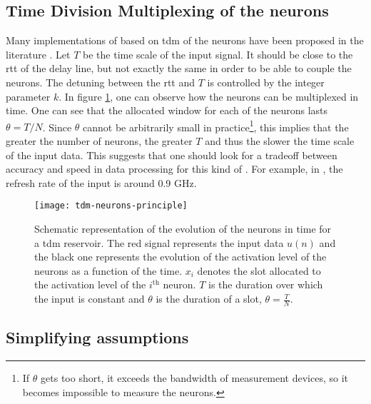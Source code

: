 
\subsection{Time Division Multiplexing of the neurons}

\label{tdm-neurons}

 Many implementations of \rcer based on \gls{tdm} of the neurons have been proposed in the literature \cite{Paquot2012, Antonik2017, Duport2016, Dejonckheere2014, Vandoorne2008, Vinckier2015}. Let $T$ be the time scale of the input signal. It should be close to the \gls{rtt} of the delay line, but not  exactly the same in order to be able to couple the neurons. The detuning between the \gls{rtt} and $T$ is controlled by the integer parameter $k$. In figure \ref{tdm-neurons-principle}, one can observe how the neurons can be multiplexed in time. One can see that the allocated window for each of the neurons lasts $\theta = T/N$. Since $\theta$ cannot be arbitrarily small in practice\footnote{If $\theta$ gets too short, it exceeds the bandwidth of measurement devices, so it becomes impossible to measure the neurons.}, this implies that the greater the number of neurons, the greater $T$ and thus the slower the time scale of the input data. This suggests that one should look for a tradeoff between accuracy and speed in data processing for this kind of \rcer. For example, in \cite{Vinckier2015}, the refresh rate of the input is around 0.9 GHz.
 
 \begin{figure}[h]
 	\centering
 	\texttt{[image: tdm-neurons-principle]}
 	\caption{Schematic representation of the evolution of the neurons in time for a \gls{tdm} reservoir. The red signal represents the input data $u(n)$ and the black one represents the evolution of the activation level of the neurons as a function of the time. $x_i$ denotes the slot allocated to the activation level of the $i^{\text{th}}$ neuron. $T$ is the duration over which the input is constant and $\theta$ is the duration of a slot, $\theta=\frac{T}{N}$.}
 	\label{tdm-neurons-principle}
 \end{figure}
 


\subsection{Simplifying assumptions}

